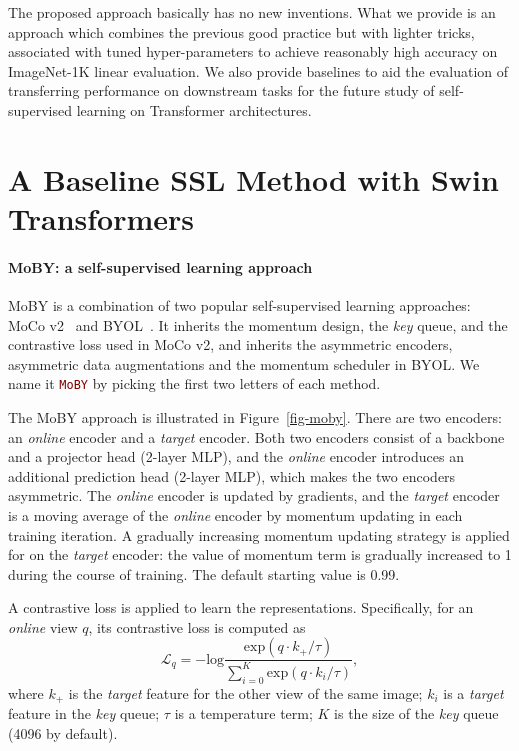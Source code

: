 \documentclass{article}
\begin{document}
The proposed approach basically has no new inventions. What we provide is an approach which combines the previous good practice but with lighter tricks, associated with tuned hyper-parameters to achieve reasonably high accuracy on ImageNet-1K linear evaluation. We also provide baselines to aid the evaluation of transferring performance on downstream tasks for the future study of self-supervised learning on Transformer architectures.

\section{A Baseline SSL Method with Swin Transformers}

\paragraph{MoBY: a self-supervised learning approach} MoBY is a combination of two popular self-supervised learning approaches: MoCo v2~\citep{mocov2} and BYOL~\citep{byol}. It inherits the momentum design, the \emph{key} queue, and the contrastive loss used in MoCo v2, and inherits the asymmetric encoders, asymmetric data augmentations and the momentum scheduler in BYOL. We name it \textcolor{Maroon}{\texttt{MoBY}} by picking the first two letters of each method.

The MoBY approach is illustrated in Figure~\ref{fig-moby}. There are two encoders: an \textit{online} encoder and a \textit{target} encoder. Both two encoders consist of a backbone and a projector head (2-layer MLP), and the \textit{online} encoder introduces an additional prediction head (2-layer MLP), which makes the two encoders asymmetric. The \textit{online} encoder is updated by gradients, and the \textit{target} encoder is a moving average of the \textit{online} encoder by momentum updating in each training iteration. A gradually increasing momentum updating strategy is applied for on the \textit{target} encoder: the value of momentum term is gradually increased to 1 during the course of training. The default starting value is 0.99.

A contrastive loss is applied to learn the representations. Specifically, for an \emph{online} view $q$, its contrastive loss is computed as
\begin{equation}
    \mathcal{L}_q = -\text{log} \frac{\text{exp}(q \cdot k_{+} / \tau)}{\sum_{i=0}^{K} \text{exp}(q \cdot k_i / \tau)},
\end{equation}
where $k_{+}$ is the \emph{target} feature for the other view of the same image; $k_i$ is a \emph{target} feature in the \emph{key} queue; $\tau$ is a temperature term; $K$ is the size of the \emph{key} queue (4096 by default).
\end{document}
